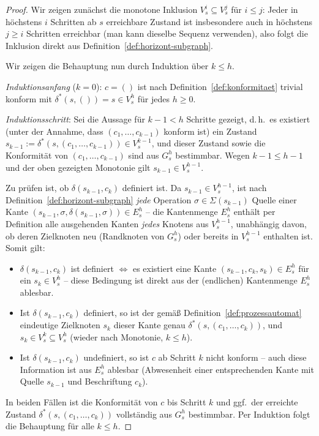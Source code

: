 ﻿\documentclass[a4paper,12pt]{article}
\theoremstyle{definition}
\begin{document}
\begin{proof}
	Wir zeigen zunächst die monotone Inklusion $V_s^i\subseteq V_s^j$ für $i\le j$: Jeder
	in höchstens $i$ Schritten ab $s$ erreichbare Zustand ist insbesondere auch in
	höchstens $j\ge i$ Schritten erreichbar (man kann dieselbe Sequenz verwenden), also
	folgt die Inklusion direkt aus Definition~\ref{def:horizont-subgraph}.

	Wir zeigen die Behauptung nun durch Induktion über $k\le h$.

	\emph{Induktionsanfang} ($k=0$): $c=()$ ist nach Definition~\ref{def:konformitaet}
	trivial konform mit $\delta^{*}(s,())=s\in V_s^h$ für jedes $h\ge0$.

	\emph{Induktionsschritt}: Sei die Aussage für $k-1<h$ Schritte gezeigt, d.\,h.\ es
	existiert (unter der Annahme, dass $(c_1,\ldots,c_{k-1})$ konform ist) ein Zustand
	$s_{k-1}:=\delta^{*}(s,(c_1,\ldots,c_{k-1}))\in V_s^{k-1}$, und dieser Zustand sowie
	die Konformität von $(c_1,\ldots,c_{k-1})$ sind aus $G_s^h$ bestimmbar. Wegen
	$k-1\le h-1$ und der oben gezeigten Monotonie gilt $s_{k-1}\in V_s^{h-1}$.

	Zu prüfen ist, ob $\delta(s_{k-1},c_k)$ definiert ist. Da $s_{k-1}\in V_s^{h-1}$, ist
	nach Definition~\ref{def:horizont-subgraph} \emph{jede} Operation
	$\sigma\in\Sigma(s_{k-1})$ Quelle einer Kante
	$(s_{k-1},\sigma,\delta(s_{k-1},\sigma))\in E_s^h$ -- die Kantenmenge $E_s^h$
	enthält per Definition alle ausgehenden Kanten \emph{jedes} Knotens aus
	$V_s^{h-1}$, unabhängig davon, ob deren Zielknoten neu (Randknoten von $G_s^h$)
	oder bereits in $V_s^{h-1}$ enthalten ist. Somit gilt:
	\begin{itemize}
		\item $\delta(s_{k-1},c_k)$ ist definiert $\iff$ es existiert eine Kante
		      $(s_{k-1},c_k,s_k)\in E_s^h$ für ein $s_k\in V_s^h$ -- diese Bedingung ist
		      direkt aus der (endlichen) Kantenmenge $E_s^h$ ablesbar.
		\item Ist $\delta(s_{k-1},c_k)$ definiert, so ist der gemäß
		      Definition~\ref{def:prozessautomat} eindeutige Zielknoten $s_k$ dieser
		      Kante genau $\delta^{*}(s,(c_1,\ldots,c_k))$, und $s_k\in V_s^{k}\subseteq
		      V_s^h$ (wieder nach Monotonie, $k\le h$).
		\item Ist $\delta(s_{k-1},c_k)$ undefiniert, so ist $c$ ab Schritt $k$ nicht
		      konform -- auch diese Information ist aus $E_s^h$ ablesbar (Abwesenheit
		      einer entsprechenden Kante mit Quelle $s_{k-1}$ und Beschriftung $c_k$).
	\end{itemize}
	In beiden Fällen ist die Konformität von $c$ bis Schritt $k$ und ggf.\ der erreichte
	Zustand $\delta^{*}(s,(c_1,\ldots,c_k))$ vollständig aus $G_s^h$ bestimmbar. Per
	Induktion folgt die Behauptung für alle $k\le h$. \qedhere
\end{proof}
\end{document}
